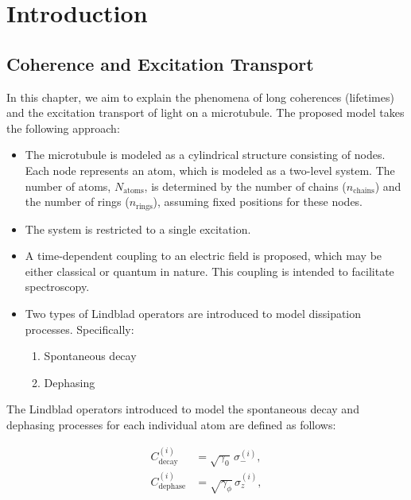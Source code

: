 \chapter{Introduction} %
\label{Chapter_Introduction} %


\section{Coherence and Excitation Transport}

In this chapter, we aim to explain the phenomena of long coherences (lifetimes) and the excitation transport of light on a microtubule. The proposed model takes the following approach:

\begin{itemize}
	\item The microtubule is modeled as a cylindrical structure consisting of nodes. Each node represents an atom, which is modeled as a two-level system. The number of atoms, \( N_{\text{atoms}} \), is determined by the number of chains (\( n_{\text{chains}} \)) and the number of rings (\( n_{\text{rings}} \)), assuming fixed positions for these nodes.
	\item The system is restricted to a single excitation.
	\item A time-dependent coupling to an electric field is proposed, which may be either classical or quantum in nature. This coupling is intended to facilitate spectroscopy.
	\item Two types of Lindblad operators are introduced to model dissipation processes. Specifically:
	      \begin{enumerate}
		      \item Spontaneous decay
		      \item Dephasing
	      \end{enumerate}
\end{itemize}
The Lindblad operators introduced to model the spontaneous decay and dephasing processes for each individual atom are defined as follows:

\begin{align}
	C_{\text{decay}}^{(i)}   & = \sqrt{\gamma_0} \, \sigma_-^{(i)},    \\
	C_{\text{dephase}}^{(i)} & = \sqrt{\gamma_\phi} \, \sigma_z^{(i)},
\end{align}

